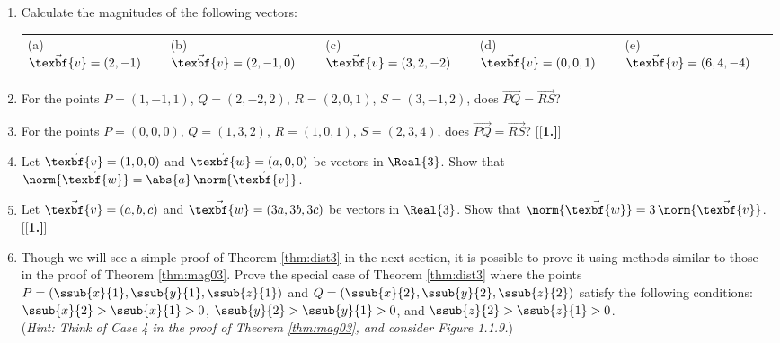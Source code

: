 \startexercises\label{sec1dot1}
\begin{enumerate}[\bfseries 1.]
 \item Calculate the magnitudes of the following vectors:\\
  \begin{tabular}{@{} l l l l l @{}}
   (a) $\vec{\texbf{v}} = (2,-1)$ & (b) $\vec{\texbf{v}} = (2,-1,0)$ & (c) $\vec{\texbf{v}} = (3,2,-2)$ & (d) $\vec{\texbf{v}} = (0,0,1)$ &
   (e) $\vec{\texbf{v}} = (6,4,-4)$
  \end{tabular}
 \item For the points $P =(1,-1,1)$, $Q=(2,-2,2)$, $R=(2,0,1)$, $S=(3,-1,2)$, does $\overrightarrow{PQ} =
  \overrightarrow{RS}$?
 \item For the points $P =(0,0,0)$, $Q=(1,3,2)$, $R=(1,0,1)$, $S=(2,3,4)$, does $\overrightarrow{PQ} =
  \overrightarrow{RS}$?
[{[\bfseries 1.]}]
 \item Let $\vec{\texbf{v}} = (1,0,0)$ and $\vec{\texbf{w}} = (a,0,0)$ be vectors in $\Real{3}$. Show that
 $\norm{\vec{\texbf{w}}} = \abs{a} \,\norm{\vec{\texbf{v}}}$.
 \item Let $\vec{\texbf{v}} = (a,b,c)$ and $\vec{\texbf{w}} = (3a,3b,3c)$ be vectors in $\Real{3}$. Show that
 $\norm{\vec{\texbf{w}}}  = 3 \,\norm{\vec{\texbf{v}}}$.
[{[\bfseries 1.]}]
 \piccaption[]{}
 \item Though we will see a simple proof of Theorem \ref{thm:dist3} in the next section, it is possible to prove it using
 methods similar to those in the proof of Theorem \ref{thm:mag03}.  Prove the special case of Theorem \ref{thm:dist3}
 where the points $P = (\ssub{x}{1},\ssub{y}{1},\ssub{z}{1})$ and $Q = (\ssub{x}{2},\ssub{y}{2},\ssub{z}{2})$
 satisfy the following conditions:\\
 $\ssub{x}{2} > \ssub{x}{1} > 0$, $\ssub{y}{2} > \ssub{y}{1} > 0$, and
 $\ssub{z}{2} > \ssub{z}{1} > 0$.\\(\emph{Hint: Think of Case 4 in the proof of
 Theorem \ref{thm:mag03}, and consider Figure 1.1.9.})\\
\end{enumerate}
\newpage
